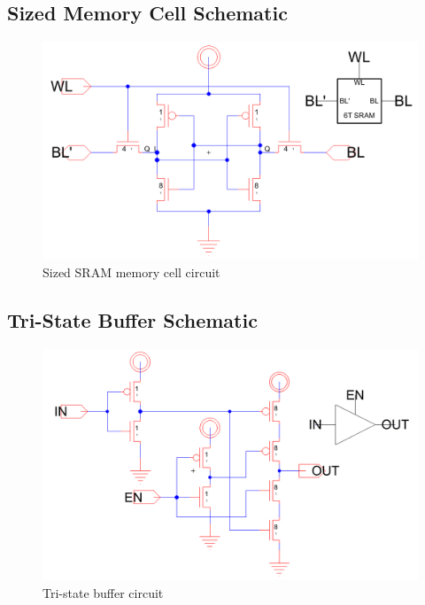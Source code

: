 \documentclass[12pt]{report}
\begin{document}
\subsection*{Sized Memory Cell Schematic}
\begin{figure}[H]
  \centering
    \includegraphics[width=1.0\textwidth]{sram_cell_circuit.png}
  \caption{Sized SRAM memory cell circuit}
  \label{fig:sram_cell_circuit}
\end{figure}

\subsection*{Tri-State Buffer Schematic}
\begin{figure}[H]
  \centering
    \includegraphics[width=1.0\textwidth]{tristate_buffer_circuit.png}
  \caption{Tri-state buffer circuit}
  \label{fig:tristate_buffer_circuit}
\end{figure}
\end{document}
